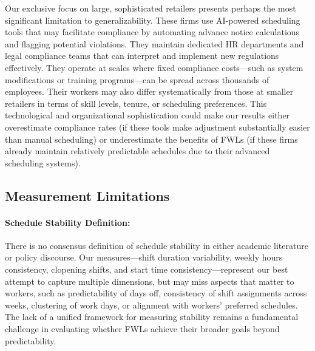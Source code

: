 \documentclass[letterpaper,11pt,leqno]{article}
\theoremstyle{paper}
\begin{document}
Our exclusive focus on large, sophisticated retailers presents perhaps the most significant limitation to generalizability. These firms use AI-powered scheduling tools that may facilitate compliance by automating advance notice calculations and flagging potential violations. They maintain dedicated HR departments and legal compliance teams that can interpret and implement new regulations effectively. They operate at scales where fixed compliance costs—such as system modifications or training programs—can be spread across thousands of employees. Their workers may also differ systematically from those at smaller retailers in terms of skill levels, tenure, or scheduling preferences. This technological and organizational sophistication could make our results either overestimate compliance rates (if these tools make adjustment substantially easier than manual scheduling) or underestimate the benefits of FWLs (if these firms already maintain relatively predictable schedules due to their advanced scheduling systems).

\subsection{Measurement Limitations}
\paragraph{Schedule Stability Definition:} There is no consensus definition of schedule stability in either academic literature or policy discourse. Our measures—shift duration variability, weekly hours consistency, clopening shifts, and start time consistency—represent our best attempt to capture multiple dimensions, but may miss aspects that matter to workers, such as predictability of days off, consistency of shift assignments across weeks, clustering of work days, or alignment with workers' preferred schedules. The lack of a unified framework for measuring stability remains a fundamental challenge in evaluating whether FWLs achieve their broader goals beyond predictability.
\end{document}
